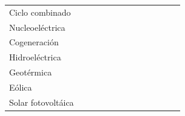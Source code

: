 \documentclass{sener2025}
\begin{document}
\begin{tabladoradoLargo}
\begin{xltabular}{\textwidth}{QZZZZZZZZZZZZ}
    \hspace{2.7em} Ciclo combinado &  &  &  &  &  &  &  &  &  &  &  &  \\
    \hspace{2.7em} Nucleoeléctrica &  &  &  &  &  &  &  &  &  &  &  &  \\
    \hspace{2.7em} Cogeneración &  &  &  &  &  &  &  &  &  &  &  &  \\
    \hspace{2.7em} Hidroeléctrica &  &  &  &  &  &  &  &  &  &  &  &  \\
    \hspace{2.7em} Geotérmica &  &  &  &  &  &  &  &  &  &  &  &  \\
    \hspace{2.7em} Eólica &  &  &  &  &  &  &  &  &  &  &  &  \\
    \hspace{2.7em} Solar fotovoltáica &  &  &  &  &  &  &  &  &  &  &  &  \\
  \end{xltabular}
\end{tabladoradoLargo}
\vspace{-4pt}
\end{document}
